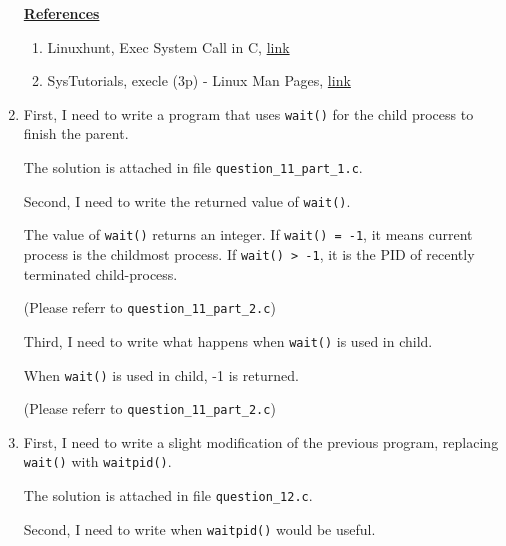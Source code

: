 \documentclass[12pt]{article}
\begin{document}
\begin{enumerate}[1.]
    \bigskip

    \underline{\textbf{References}}

    \begin{enumerate}[1)]
        \item Linuxhunt, Exec System Call in C, \href{https://linuxhint.com/exec_linux_system_call_c/}{link}
        \item SysTutorials, execle (3p) - Linux Man Pages, \href{https://www.systutorials.com/docs/linux/man/3p-execle/}{link}
    \end{enumerate}

    \item

    First, I need to write a program that uses \texttt{wait()} for the child process
    to finish the parent.

    \bigskip

    The solution is attached in file \texttt{question\_11\_part\_1.c}.

    \bigskip

    Second, I need to write the returned value of \texttt{wait()}.

    \bigskip

    The value of \texttt{wait()} returns an integer. If \texttt{wait() = -1}, it means
    current process is the childmost process. If \texttt{wait() > -1}, it is the PID
    of recently terminated child-process.

    \bigskip

    (Please referr to \texttt{question\_11\_part\_2.c})

    \bigskip

    Third, I need to write what happens when \texttt{wait()} is used in child.

    \bigskip

    When \texttt{wait()} is used in child, -1 is returned.

    \bigskip

    (Please referr to \texttt{question\_11\_part\_2.c})

    \item

    First, I need to write a slight modification of the previous program, replacing
    \texttt{wait()} with \texttt{waitpid()}.

    \bigskip

    The solution is attached in file \texttt{question\_12.c}.

    \bigskip

    Second, I need to write when \texttt{waitpid()} would be useful.


\end{enumerate}
\end{document}
